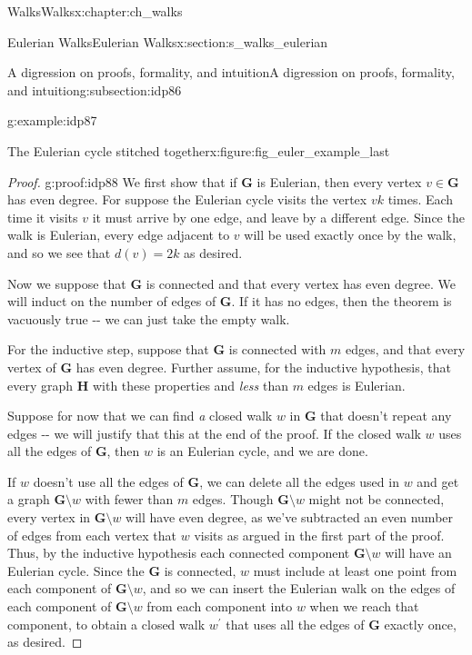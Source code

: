 \documentclass[oneside,10pt,]{book}
\numberwithin{equation}{section}
\newcommand{\bfG}{\mathbf{G}}
\newcommand{\bfH}{\mathbf{H}}
\begin{document}
\begin{chapterptx}{Walks}{}{Walks}{}{}{x:chapter:ch_walks}
\begin{sectionptx}{Eulerian Walks}{}{Eulerian Walks}{}{}{x:section:s_walks_eulerian}
\begin{subsectionptx}{A digression on proofs, formality, and intuition}{}{A digression on proofs, formality, and intuition}{}{}{g:subsection:idp86}
\begin{example}{}{g:example:idp87}
\begin{figureptx}{The Eulerian cycle stitched together}{x:figure:fig_euler_example_last}{}
\begin{image}{0.15}{0.7}{0.15}
{\begin{tikzpicture}[scale=2]
\end{tikzpicture}
}%
\end{image}%
\tcblower
\end{figureptx}%
\end{example}
\begin{proof}{}{g:proof:idp88}
We first show that if \(\bfG\) is Eulerian, then every vertex \(v\in\bfG\) has even degree.  For suppose the Eulerian cycle visits the vertex \(v k\) times.  Each time it visits \(v\) it must arrive by one edge, and leave by a different edge. Since the walk is Eulerian, every edge adjacent to \(v\) will be used exactly once by the walk, and so we see that \(d(v)=2k\) as desired.%
\par
Now we suppose that \(\bfG\) is connected and that every vertex has even degree.  We will induct on the number of edges of \(\bfG\).  If it has no edges, then the theorem is vacuously true -{}-{} we can just take the empty walk.%
\par
For the inductive step, suppose that \(\bfG\) is connected with \(m\) edges, and that every vertex of \(\bfG\) has even degree.  Further assume, for the inductive hypothesis, that every graph \(\bfH\) with these properties and \emph{less} than \(m\) edges is Eulerian.%
\par
Suppose for now that we can find \emph{a} closed walk \(w\) in \(\bfG\) that doesn't repeat any edges -{}-{} we will justify that this at the end of the proof.  If the closed walk \(w\) uses all the edges of \(\bfG\), then \(w\) is an Eulerian cycle, and we are done.%
\par
If \(w\) doesn't use all the edges of \(\bfG\), we can delete all the edges used in \(w\) and get a graph \(\bfG\setminus w\) with fewer than \(m\) edges.  Though \(\bfG\setminus w\) might not be connected, every vertex in \(\bfG\setminus w\) will have even degree, as we've subtracted an even number of edges from each vertex that \(w\) visits as argued in the first part of the proof.  Thus, by the inductive hypothesis each connected component \(\bfG\setminus w\) will have an Eulerian cycle.  Since the \(\bfG\) is connected, \(w\) must include at least one point from each component of \(\bfG\setminus w\), and so we can insert the Eulerian walk on the edges of each component of \(\bfG\setminus w\) from each component into \(w\) when we reach that component, to obtain a closed walk \(w^\prime\) that uses all the edges of \(\bfG\) exactly once, as desired.%
\par

\end{proof}
\end{subsectionptx}
\end{sectionptx}
\end{chapterptx}
\end{document}
